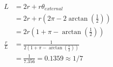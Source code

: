 \documentclass[12pt]{article}
\begin{document}
\begin{align*}
L &= 2r + r\theta_{external} \\
  &= 2r + r\left(2\pi - 2\arctan\left(\frac{1}{2}\right)\right) \\
  &= 2r\left(1 + \pi - \arctan\left(\frac{1}{2}\right)\right) \\ 
\frac{r}{L} &= \frac{1}{2\left(1 + \pi - \arctan\left(\frac{1}{2}\right)\right)} \\
            &= \frac{1}{7.356} = 0.1359 \approx 1/7
\end{align*}
\end{document}
